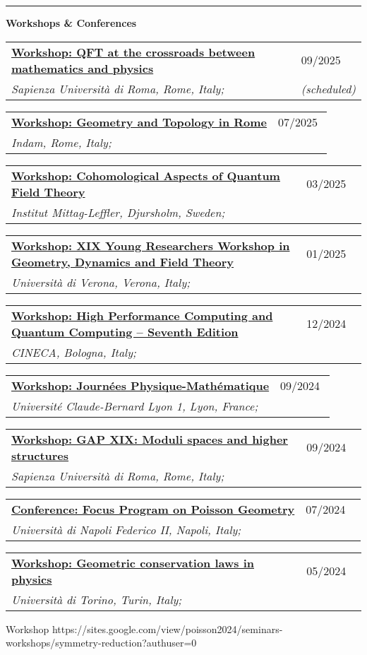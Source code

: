 \documentclass[a4paper]{article}
\newcommand{\block}[1]{\hrule \vspace{0.2cm} \textbf{\Large #1} \vspace{0.2cm}}
\newcommand{\longvoice}[8]{
	\begin{tabular}{p{0.83\linewidth} p{0.17\linewidth} }
		\textbf{\href{#3}{#2: #1}} & #4 
		\\ 
		\textit{#5, #6, #7;} & {\small\emph{#8}}
	\end{tabular}
	\vspace{.5em}
}
\begin{document}

	\block{Workshops \& Conferences}

    \longvoice{QFT at the crossroads between mathematics and physics}
        {Workshop}
        {https://sites.google.com/view/qft-at-the-crossroads/home?authuser=0}
        {09/2025}
        {Sapienza Università di Roma}
        {Rome}
        {Italy}
        {(scheduled)}
    \longvoice{Geometry and Topology in Rome}
        {Workshop}
        {https://www.mat.uniroma2.it/~kowalzig/ws.html}
        {07/2025}
        {Indam}
        {Rome}
        {Italy}
        {}	
	\longvoice{Cohomological Aspects of Quantum Field Theory}
		{Workshop}
		{https://www.mittag-leffler.se/activities/cohomological-aspects-of-quantum-field-theory/}
		{03/2025}
		{Institut Mittag-Leffler}
		{Djursholm}
		{Sweden}
		{}
	\longvoice{XIX Young Researchers Workshop in Geometry, Dynamics and Field Theory}
		{Workshop}
		{https://sites.google.com/view/xix-yrw-verona/program?authuser=0}
		{01/2025}
		{Università di Verona}
		{Verona}
		{Italy}
		{}
	\longvoice{High Performance Computing and Quantum Computing – Seventh Edition}
		{Workshop}
		{https://eventi.cineca.it/en/hpc/high-performance-computing-and-quantum-computing-seventh-edition/bologna-20241212}
		{12/2024}
		{CINECA}
		{Bologna}
		{Italy}
		{}
	\longvoice{Journées Physique-Mathématique}
		{Workshop}
		{https://indico.math.cnrs.fr/event/12743/overview}
		{09/2024}
		{Université Claude-Bernard Lyon 1}
		{Lyon}
		{France}
		{}
	\longvoice{GAP XIX: Moduli spaces and higher structures}
		{Workshop}
		{https://www1.mat.uniroma1.it/~fiorenza/GAP-Rome/GAP-XIX-2024-Rome.html}
		{09/2024}
		{Sapienza Università di Roma}
		{Rome}
		{Italy}
		{}
	\longvoice{Focus Program on Poisson Geometry}
		{Conference}
		{https://sites.google.com/view/poisson2024/poisson-2024?authuser=0}
		{07/2024}
		{Università di Napoli Federico II}
		{Napoli}
		{Italy}
		{}
	\longvoice{Geometric conservation laws in physics}
		{Workshop}
		{https://www.dropbox.com/scl/fi/j54tl4m10fl2scbrtc4sx/2405-Torino-Conservationlaws.pdf?rlkey=ay7nrxda4fg8lklvox578g6yj\&st=9t3jx47r\&dl=0}
		{05/2024}
		{Università di Torino}
		{Turin}
		{Italy}
		{}
		{Workshop}
		{https://sites.google.com/view/poisson2024/seminars-workshops/symmetry-reduction?authuser=0}
\end{document}
